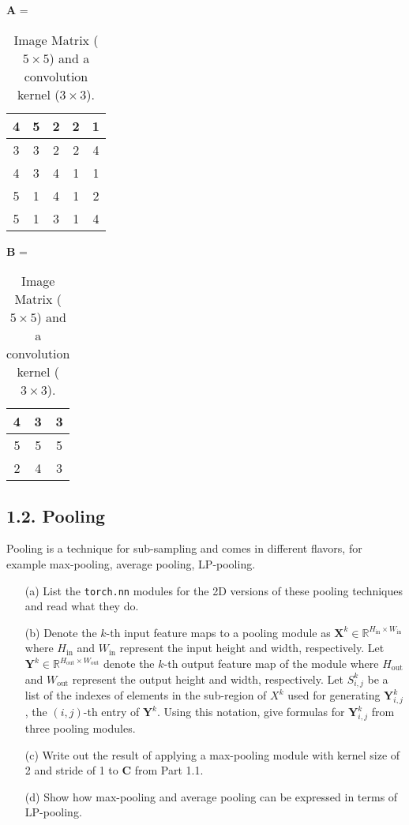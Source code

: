 \documentclass[12pt,letterpaper]{article}
\newcommand{\matr}[1]{\bm{#1}}     %
\begin{document}
\begin{table}[!ht]
    \centering
    $\matr{A}$ =  \begin{tabular}{|c|c|c|c|c|} 
    \hline
       4 & 5 & 2 & 2 & 1 \\ \hline 
       3 & 3 & 2 & 2 & 4 \\ \hline
       4 & 3 & 4 & 1 & 1 \\ \hline 
       5 & 1 & 4 & 1 & 2 \\ \hline
       5 & 1 & 3 & 1 & 4 \\ \hline
    \end{tabular}\hspace{1cm}
    $\matr{B}$ = \begin{tabular}{|c|c|c|} 
    \hline
       4 & 3 & 3 \\ \hline 
       5 & 5 & 5 \\ \hline
       2 & 4 & 3 \\ \hline 
    \end{tabular}
    \caption{Image Matrix ($5\times 5$) and a convolution kernel ($3\times 3$).}
    \label{tab1}
   
\end{table}

\newpage 

\subsection*{1.2. Pooling}
Pooling is a technique for sub-sampling and comes in different flavors, for example max-pooling, average pooling, LP-pooling. 
\begin{itemize}
    \item[(a)] List the \texttt{torch.nn} modules for the 2D versions of these pooling techniques and read what they do.

    \item[(b)] Denote the $k$-th input feature maps to a pooling module as $\matr{X}^k \in \mathbb{R}^{H_{\textrm{in}}\times W_{\textrm{in}}} $ where $H_{\textrm{in}}$ and $W_{\text{in}}$ represent the input height and width, respectively. Let $\matr{Y}^k \in \mathbb{R}^{H_{\text{out}}\times W_{\textrm{out}}}$ denote the $k$-th output feature map of the module where $H_{\textrm{out}}$ and $W_{\textrm{out}}$ represent the output height and width, respectively. Let $S^{k}_{i,j}$ be a list of the indexes of elements in the sub-region of $X^k $ used for generating $\matr{Y}^k_{i,j}$, the $(i,j)$-th entry of $\matr{Y}^{k}$. 
    Using this notation, give formulas for $\matr{Y}^k_{i,j} $ from three pooling modules.
   
    \item[(c)] Write out the result of applying a max-pooling module with kernel size of 2 and stride of 1 to $\matr{C}$ from Part 1.1.
  
    \item[(d)] Show how max-pooling and average pooling can be expressed in terms of LP-pooling.
   
\end{itemize}
\end{document}
